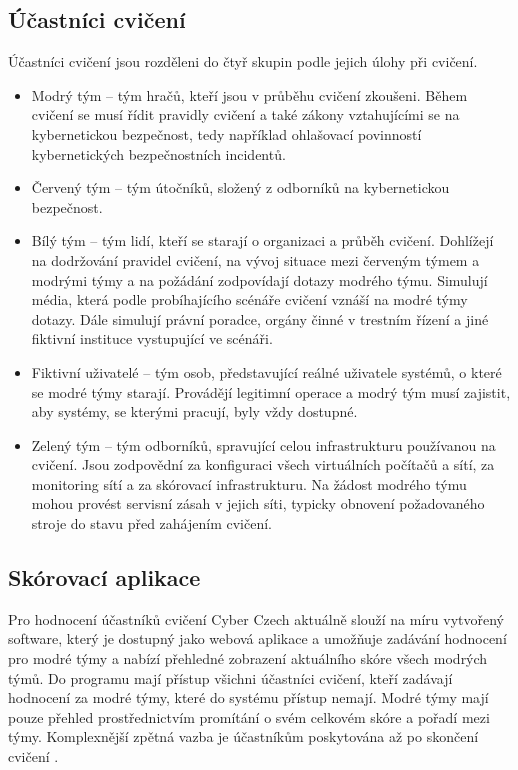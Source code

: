 \documentclass[
  digital,
  twoside,
  table, 
  nolof, 
  nolot
]{fithesis3}
\begin{document}
\subsection{Účastníci cvičení}
Účastníci cvičení jsou rozděleni do čtyř skupin podle jejich úlohy při cvičení.

\begin{itemize}
\item Modrý tým -- tým hračů, kteří jsou v průběhu cvičení zkoušeni. Během cvičení se musí řídit pravidly cvičení a také zákony vztahujícími se na kybernetickou bezpečnost, tedy například ohlašovací povinností kybernetických bezpečnostních incidentů.
\item Červený tým -- tým útočníků, složený z odborníků na kybernetickou bezpečnost. 
\item Bílý tým -- tým lidí, kteří se starají o organizaci a průběh cvičení. Dohlížejí na dodržování pravidel cvičení, na vývoj situace mezi červeným týmem a modrými týmy a na požádání zodpovídají dotazy modrého týmu. Simulují média, která podle probíhajícího scénáře cvičení vznáší na modré týmy dotazy. Dále simulují právní poradce, orgány činné v trestním řízení a jiné fiktivní instituce vystupující ve scénáři.
\item Fiktivní uživatelé -- tým osob, představující reálné uživatele systémů, o které se modré týmy starají. Provádějí legitimní operace a modrý tým musí zajistit, aby systémy, se kterými pracují, byly vždy dostupné.
\item Zelený tým -- tým odborníků, spravující celou infrastrukturu používanou na cvičení. Jsou zodpovědní za konfiguraci všech virtuálních počítačů a sítí, za monitoring sítí a za skórovací infrastrukturu. Na žádost modrého týmu mohou provést servisní zásah v jejich síti, typicky obnovení požadovaného stroje do stavu před zahájením cvičení.
\end{itemize}

\subsection{Skórovací aplikace}
Pro hodnocení účastníků cvičení Cyber Czech aktuálně slouží na míru vytvořený software, který je dostupný jako webová aplikace a umožňuje zadávání hodnocení pro modré týmy a nabízí přehledné zobrazení aktuálního skóre všech modrých týmů. Do programu mají přístup všichni účastníci cvičení, kteří zadávají hodnocení za modré týmy, které do systému přístup nemají. Modré týmy mají pouze přehled prostřednictvím promítání o svém celkovém skóre a pořadí mezi týmy. Komplexnější zpětná vazba je účastníkům poskytována až po skončení cvičení \cite{Vykopal2017TimelyExercises}.
\end{document}

